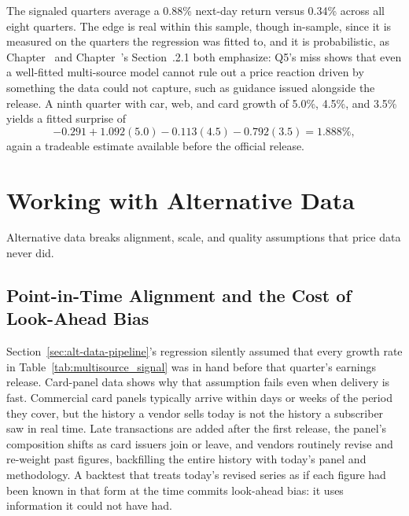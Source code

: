 \documentclass[../ai_in_finance]{subfiles}
\begin{document}
The signaled quarters average a 0.88\% next-day return versus 0.34\% across all eight quarters. The edge is real within this sample, though in-sample, since it is measured on the quarters the regression was fitted to, and it is probabilistic, as Chapter~ and Chapter~'s Section~.2.1 both emphasize: Q5's miss shows that even a well-fitted multi-source model cannot rule out a price reaction driven by something the data could not capture, such as guidance issued alongside the release. A ninth quarter with car, web, and card growth of 5.0\%, 4.5\%, and 3.5\% yields a fitted surprise of
\begin{equation*}
-0.291 + 1.092(5.0) - 0.113(4.5) - 0.792(3.5) = 1.888\%,
\end{equation*}
again a tradeable estimate available before the official release.

\section{Working with Alternative Data}

Alternative data breaks alignment, scale, and quality assumptions that price data never did.

\subsection{Point-in-Time Alignment and the Cost of Look-Ahead Bias}
\label{sec:point-in-time}

Section~\ref{sec:alt-data-pipeline}'s regression silently assumed that every growth rate in Table~\ref{tab:multisource_signal} was in hand before that quarter's earnings release. Card-panel data shows why that assumption fails even when delivery is fast. Commercial card panels typically arrive within days or weeks of the period they cover, but the history a vendor sells today is not the history a subscriber saw in real time. Late transactions are added after the first release, the panel's composition shifts as card issuers join or leave, and vendors routinely revise and re-weight past figures, backfilling the entire history with today's panel and methodology. A backtest that treats today's revised series as if each figure had been known in that form at the time commits look-ahead bias: it uses information it could not have had.
\end{document}
